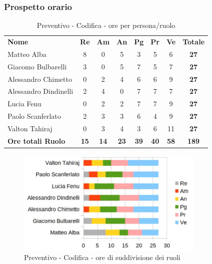 	\subsubsection{Prospetto orario}

		\begin{table} [h!]
			\begin{center}
				\begin{tabular} { m{3.5cm} c c c c c c c }
					\rowcolor{lightgray}
					\textbf{Nome} & \textbf{Re} & \textbf{Am} & \textbf{An} & \textbf{Pg} & \textbf{Pr} & \textbf{Ve} & \textbf{Totale} \\
					Matteo Alba & 8 &0 & 5 & 3 & 5 & 6 & \textbf{27} \\
					Giacomo Bulbarelli & 3 & 0& 5 & 7 & 5 & 7 & \textbf{27} \\
					Alessandro Chimetto & 0& 2 & 4 & 6 & 6 & 9 & \textbf{27} \\
					Alessandro Dindinelli & 2 & 4 & 0& 7 & 7 & 7 & \textbf{27} \\
					Lucia Fenu &0 & 2 & 2 & 7 & 7 & 9 & \textbf{27} \\
					Paolo Scanferlato & 2 & 3 & 3 & 6 & 4 & 9 & \textbf{27} \\
					Valton Tahiraj &0 & 3 & 4 & 3 & 6 & 11 & \textbf{27} \\
					\textbf{Ore totali Ruolo} & \textbf{15} & \textbf{14} & \textbf{23} & \textbf{39} & \textbf{40}& \textbf{58} & \textbf{189}
				\end{tabular}
				\caption{Preventivo - Codifica  - ore per persona/ruolo}
			\end{center}
		\end{table}
		
		\begin{figure} [h!]
			\centering
			\includegraphics[width=0.8\textwidth]{res/img/grafici/progettazione_architetturale_ore_ruolo.jpg}
			\caption{Preventivo - Codifica  - ore di suddivisione dei ruoli} 
		\end{figure}
		
